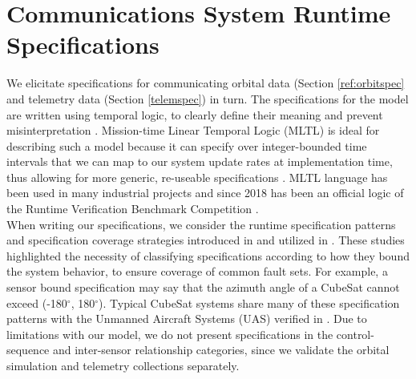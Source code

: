 \documentclass[conf]{new-aiaa}
\begin{document}
\section{Communications System Runtime Specifications}  
\label{CSRS}

We elicitate specifications for communicating orbital data (Section \ref{ref:orbitspec} and telemetry data (Section \ref{telemspec}) in turn. %
%
The specifications for the model are written using temporal logic, to clearly define their meaning and prevent misinterpretation \cite{Roz16}. Mission-time Linear Temporal Logic (MLTL) is ideal for describing such a model because it can specify over integer-bounded time intervals that we can map to our system update rates at implementation time, thus allowing for more generic, re-useable specifications \cite{RRS14,LVR19,LR18}.
MLTL language has been used in many industrial projects and since 2018 has been an official logic of the Runtime Verification Benchmark Competition \cite{RRS14,GRS14,SRRMMI15,RSI15,SMR15,SMR16,MRS17,RVBC2018,Cauwels2020,KZJZR20}.\\

When writing our specifications, we consider the runtime specification patterns and specification coverage strategies introduced in \cite{Roz16} and utilized in \cite{Cauwels2020}. These studies highlighted the necessity of classifying specifications according to how they bound the system behavior, to ensure coverage of common fault sets. For example, a sensor bound specification may say that the azimuth angle of a CubeSat cannot exceed (-180$^{\circ}$, 180$^{\circ}$). Typical CubeSat systems share many of these specification patterns with the Unmanned Aircraft Systems (UAS) verified in \cite{Cauwels2020}. Due to limitations with our model, we do not present specifications in the control-sequence and inter-sensor relationship categories, since we validate the orbital simulation and telemetry collections separately.
\end{document}
